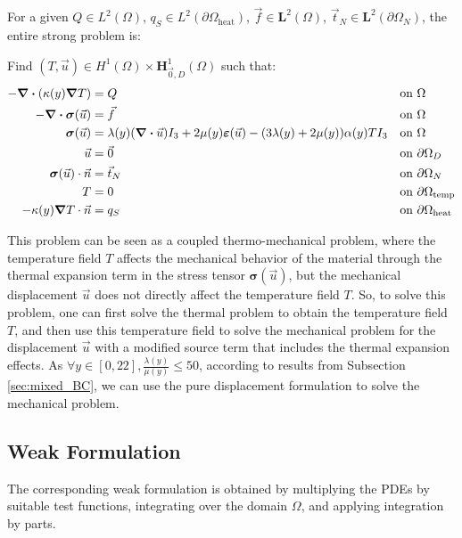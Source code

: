 \documentclass[a4paper,12pt,twoside]{report}
\begin{document}
For a given $Q \in L^2(\Omega)$, $q_S \in L^2(\partial \Omega_{\text{heat}})$, $\vec f \in \boldsymbol L^2(\Omega)$, $\vec t_N \in \boldsymbol L^2(\partial \Omega_N)$, the entire strong problem is:
\begin{tcolorbox}
Find $(T,\vec u) \in H^1(\Omega) \times \boldsymbol H^1_{\vec 0,D}(\Omega)$ such that:
\begin{align}
	- \div (\kappa(y) \grad T) &= Q && \text{on } \Omega \\
	- \div \boldsymbol{\sigma}(\vec u) &= \vec f && \text{on } \Omega \\
	\boldsymbol{\sigma}(\vec u) &= \lambda(y) (\div \vec u) I_3 + 2\mu(y) \boldsymbol{\varepsilon}(\vec u) - (3\lambda(y) + 2\mu(y)) \alpha(y) T I_3 && \text{on } \Omega \\
	\vec u &= \vec 0 && \text{on } \partial\Omega_D \\
	\boldsymbol{\sigma}(\vec u) \cdot \vec n &= \vec t_N && \text{on } \partial\Omega_N \\
	T &= 0 && \text{on } \partial\Omega_{\text{temp}} \\
	-\kappa(y) \grad T \cdot \vec n &= q_S && \text{on } \partial\Omega_{\text{heat}}
\end{align}
\end{tcolorbox}

This problem can be seen as a coupled thermo-mechanical problem, where the temperature field $T$ affects the mechanical behavior of the material through the thermal expansion term in the stress tensor $\boldsymbol{\sigma}(\vec u)$, but the mechanical displacement $\vec u$ does not directly affect the temperature field $T$. So, to solve this problem, one can first solve the thermal problem to obtain the temperature field $T$, and then use this temperature field to solve the mechanical problem for the displacement $\vec u$ with a modified source term that includes the thermal expansion effects. As $\displaystyle \forall y \in [0,22], \frac{\lambda(y)}{\mu(y)} \leq 50$, according to results from Subsection \ref{sec:mixed_BC}, we can use the pure displacement formulation to solve the mechanical problem.

\subsection{Weak Formulation}

The corresponding weak formulation is obtained by multiplying the PDEs by suitable test functions, integrating over the domain $\Omega$, and applying integration by parts.
\end{document}
